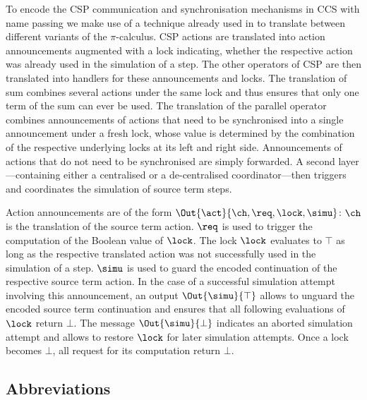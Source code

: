 \documentclass[]{eptcs}
\begin{document}
To encode the CSP communication and synchronisation mechanisms in CCS with name passing we make use of a technique already used in \cite{petersNestmann12, peters12} to translate between different variants of the $ \pi $-calculus. CSP actions are translated into action announcements augmented with a lock indicating, whether the respective action was already used in the simulation of a step. The other operators of CSP are then translated into handlers for these announcements and locks.
The translation of sum combines several actions under the same lock and thus ensures that only one term of the sum can ever be used.
The translation of the parallel operator combines announcements of actions that need to be synchronised into a single announcement under a fresh lock, whose value is determined by the combination of the respective underlying locks at its left and right side. Announcements of actions that do not need to be synchronised are simply forwarded.
A second layer---containing either a centralised or a de-centralised coordinator---then triggers and coordinates the simulation of source term steps.

Action announcements are of the form $ \Out{\act}{\ch, \req, \lock, \simu} $: $ \ch $ is the translation of the source term action. $ \req $ is used to trigger the computation of the Boolean value of $ \lock $. The lock $ \lock $ evaluates to $ \top $ as long as the respective translated action was not successfully used in the simulation of a step. $ \simu $ is used to guard the encoded continuation of the respective source term action. In the case of a successful simulation attempt involving this announcement, an output $ \Out{\simu}{\top} $ allows to unguard the encoded source term continuation and ensures that all following evaluations of $ \lock $ return $ \bot $. The message $ \Out{\simu}{\bot} $ indicates an aborted simulation attempt and allows to restore $ \lock $ for later simulation attempts. Once a lock becomes $ \bot $, all request for its computation return $ \bot $.

\subsection{Abbreviations}
\end{document}
